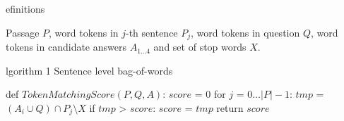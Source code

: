 \subtitle Definitions

Passage $P$, word tokens in $j$-th sentence $P_j$, word tokens in question $Q$, word tokens in candidate answers $A_{1\ldots4}$ and set of stop words $X$.

\subtitle Algorithm 1 Sentence level bag-of-words

\begalg
def $TokenMatchingScore(P, Q, A)$:
  $score$ = $0$
  for $j$ = $0\ldots|P|-1$:
    $tmp$ = $(A_i\cup Q) \cap P_j \setminus X$
    if $tmp$ > $score$:
      $score$ = $tmp$
  return $score$
\endalg